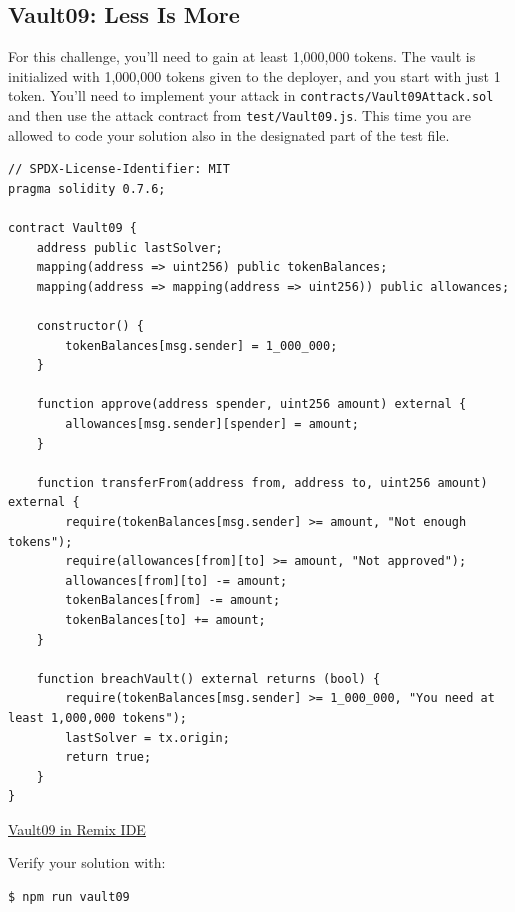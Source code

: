 \documentclass[12pt]{article}
\begin{document}
\subsection*{Vault09: Less Is More}

For this challenge, you'll need to gain at least 1,000,000 tokens. The vault is initialized with 1,000,000 tokens given to the deployer, and you start with just 1 token. You'll need to implement your attack in \texttt{contracts/Vault09Attack.sol} and then use the attack contract from \texttt{test/Vault09.js}. This time you are allowed to code your solution also in the designated part of the test file.

\begin{lstlisting}[language=Solidity]
// SPDX-License-Identifier: MIT
pragma solidity 0.7.6;

contract Vault09 {
    address public lastSolver;
    mapping(address => uint256) public tokenBalances;
    mapping(address => mapping(address => uint256)) public allowances;
    
    constructor() {
        tokenBalances[msg.sender] = 1_000_000;
    }
    
    function approve(address spender, uint256 amount) external {
        allowances[msg.sender][spender] = amount;
    }
    
    function transferFrom(address from, address to, uint256 amount) external {
        require(tokenBalances[msg.sender] >= amount, "Not enough tokens");
        require(allowances[from][to] >= amount, "Not approved");
        allowances[from][to] -= amount;
        tokenBalances[from] -= amount;
        tokenBalances[to] += amount;
    }
    
    function breachVault() external returns (bool) {
        require(tokenBalances[msg.sender] >= 1_000_000, "You need at least 1,000,000 tokens");
        lastSolver = tx.origin;
        return true;
    }
}
\end{lstlisting}

\medskip
\noindent
\href{https://remix.ethereum.org/?#activate=solidity&url=https://github.com/radovluk/unbreakable-vault/contracts/Vault09.sol&lang=en&optimize=false&runs=200&evmVersion=null&version=soljson-v0.7.6+commit.7338295f.js}{Vault09 in Remix IDE}

\medskip
\noindent
Verify your solution with:
\begin{verbatim}
$ npm run vault09
\end{verbatim}
\end{document}
